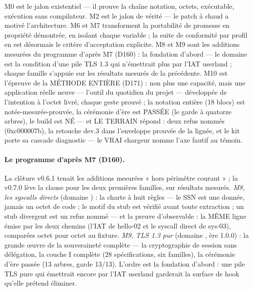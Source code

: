 M0 est le jalon existentiel — il prouve la chaîne notation, octets, exécutable, exécution
sans compilateur. M2 est le jalon de vérité — le patch à chaud a motivé l'architecture.
M6 et M7 transforment la portabilité de promesse en propriété démontrée, en isolant chaque
variable ; la suite de conformité par profil en est désormais le critère d'acceptation
explicite. M8 et M9 sont les additions mesurées du programme d'après M7 (D160) : la
fondation d'abord — le domaine  est la condition d'une pile TLS 1.3 qui
n'émettrait plus par l'IAT userland ; chaque famille s'appuie sur les résultats
mesurés de la précédente. M10 est l'épreuve de la MÉTHODE ENTIÈRE (D171) : non plus
une capacité, mais une application réelle neuve — l'outil du quotidien du projet —
développée de l'intention à l'octet livré, chaque geste prouvé ; la notation entière
(18 blocs) est notée-mesurée-prouvée, la cérémonie d'ère est PASSÉE (le garde à
quatorze arbres), le build est NÉ — et LE TERRAIN répond : deux refus nommés
(0xc000007b), la retouche dev.3 dans l'enveloppe prouvée de la lignée, et le kit
porte sa cascade diagnostic — le VRAI chargeur nomme l'axe fautif au témoin.

\paragraph{Le programme d'après M7 (D160).} La clôture v0.6.1 tenait les additions
mesurées « hors périmètre courant » ; la v0.7.0 lève la clause pour les deux
premières familles, sur résultats mesurés. \emph{M8, les syscalls directs} (domaine
) : la charte à huit règles — le SSN est une donnée, jamais un octet de
code ; le motif du stub est vérifié avant toute extraction ; un stub divergent est
un refus nommé — et la preuve d'observable : la MÊME ligne émise par les deux
chemins (l'IAT  de hello-02 et le syscall direct 
de sys-03), comparées octet pour octet au fixture. \emph{M9, TLS 1.3 pur} (domaine
, ère 1.0.0) : la grande œuvre de la souveraineté complète — la
cryptographie de session sans délégation, la couche I complète (28 spécifications,
six familles), la cérémonie d'ère passée (13 arbres, garde 13/13). L'ordre est la
fondation d'abord : une pile TLS pure qui émettrait encore par l'IAT userland
garderait la surface de hook qu'elle prétend éliminer.

